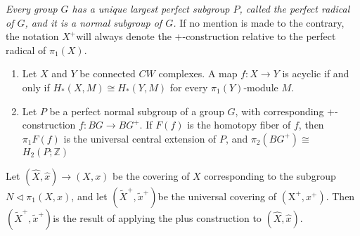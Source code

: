 \textit{Every group $G$ has a unique largest perfect subgroup $P$, called the perfect radical of $G$, and it is a normal subgroup of $G$. }If no mention is made to the contrary, the notation $X^{+}$will always denote the +-construction relative to the perfect radical of $\pi_1(X)$.

\begin{prop} %
    \begin{enumerate}
        \item Let $X$ and $Y$ be connected $C W$ complexes. A map $f: X \rightarrow Y$ is acyclic if and only if $H_*(X, M) \cong H_*(Y, M)$ for every $\pi_1(Y)$-module $M$.
        \item Let $P$ be a perfect normal subgroup of a group $G$, with corresponding +-construction $f: B G \rightarrow B G^{+}$. If $F(f)$ is the homotopy fiber of $f$, then $\pi_1 F(f)$ is the universal central extension of $P$, and $\pi_2\left(B G^{+}\right) \cong$ $H_2(P ; \mathbb{Z})$
    \end{enumerate}
\end{prop}






\begin{prop}
Let $(\hat{X}, \hat{x}) \longrightarrow(X, x)$ be the covering of $X$ corresponding to the subgroup $N \triangleleft \pi_1(X, x)$, and let $\left(\tilde{X}^{+}, \tilde{x}^{+}\right)$be the universal covering of $\left(\mathrm{X}^{+}, x^{+}\right)$. Then $\left(\tilde{X}^{+}, \tilde{x}^{+}\right)$is the result of applying the plus construction to $(\hat{X}, \hat{x})$.

\end{prop}
